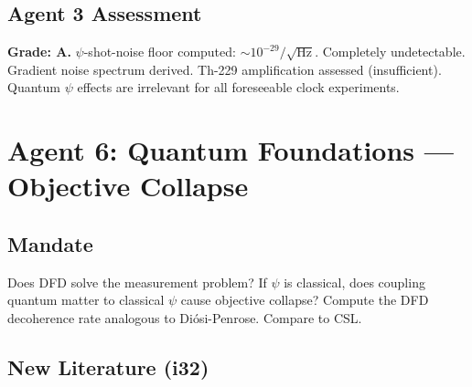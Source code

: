 \documentclass[11pt,a4paper]{article}
\begin{document}
\subsection{Agent 3 Assessment}

\textbf{Grade: A.} $\psi$-shot-noise floor computed: $\sim 10^{-29}/\sqrt{\text{Hz}}$. Completely undetectable. Gradient noise spectrum derived. Th-229 amplification assessed (insufficient). Quantum $\psi$ effects are irrelevant for all foreseeable clock experiments.


\newpage
\section{Agent 6: Quantum Foundations --- Objective Collapse}
\label{sec:agent6}

\subsection{Mandate}

Does DFD solve the measurement problem? If $\psi$ is classical, does coupling quantum matter to classical $\psi$ cause objective collapse? Compute the DFD decoherence rate analogous to Di\'{o}si-Penrose. Compare to CSL.

\subsection{New Literature (i32)}
\end{document}
